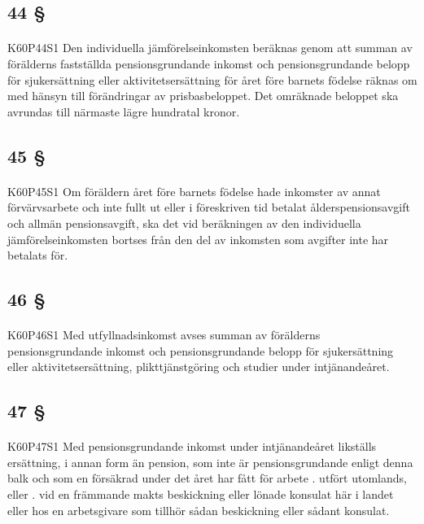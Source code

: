 \documentclass[a4paper,notitlepage,openany,10pt]{book}
\begin{document}
\subsection*{44 §}
\paragraph*{}
{\tiny K60P44S1}
Den individuella jämförelseinkomsten beräknas genom att summan av förälderns fastställda pensionsgrundande inkomst och pensionsgrundande belopp för sjukersättning eller aktivitetsersättning för året före barnets födelse räknas om med hänsyn till förändringar av prisbasbeloppet. Det omräknade beloppet ska avrundas till närmaste lägre hundratal kronor.
\subsection*{45 §}
\paragraph*{}
{\tiny K60P45S1}
Om föräldern året före barnets födelse hade inkomster av annat förvärvsarbete och inte fullt ut eller i föreskriven tid betalat ålderspensionsavgift och allmän pensionsavgift, ska det vid beräkningen av den individuella jämförelseinkomsten bortses från den del av inkomsten som avgifter inte har betalats för.
\subsection*{46 §}
\paragraph*{}
{\tiny K60P46S1}
Med utfyllnadsinkomst avses summan av förälderns pensionsgrundande inkomst och pensionsgrundande belopp för sjukersättning eller aktivitetsersättning, plikttjänstgöring och studier under intjänandeåret.
\subsection*{47 §}
\paragraph*{}
{\tiny K60P47S1}
Med pensionsgrundande inkomst under intjänandeåret likställs ersättning, i annan form än pension, som inte är pensionsgrundande enligt denna balk och som en försäkrad under det året har fått för arbete
. utfört utomlands, eller
. vid en främmande makts beskickning eller lönade konsulat här i landet eller hos en arbetsgivare som tillhör sådan beskickning eller sådant konsulat.
\end{document}
